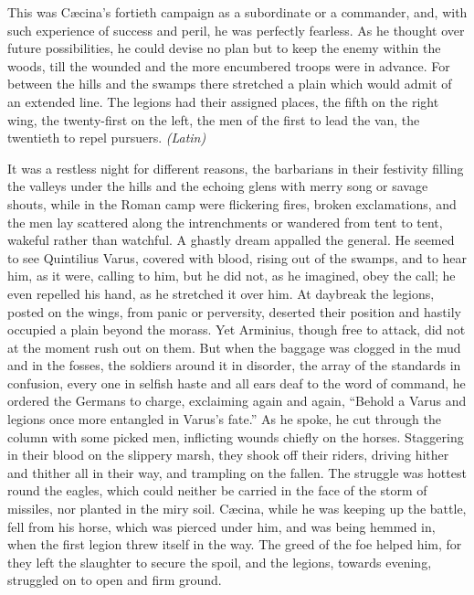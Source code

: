 This was Cæcina's fortieth campaign as a subordinate or a commander, and, with such experience of success and peril, he was perfectly fearless. As he thought over future possibilities, he could devise no plan but to keep the enemy within the woods, till the wounded and the more encumbered troops were in advance. For between the hills and the swamps there stretched a plain which would admit of an extended line. The legions had their assigned places, the fifth on the right wing, the twenty-first on the left, the men of the first to lead the van, the twentieth to repel pursuers. \emph{(Latin)}


It was a restless night for different reasons, the barbarians in their festivity filling the valleys under the hills and the echoing glens with merry song or savage shouts, while in the Roman camp were flickering fires, broken exclamations, and the men lay scattered along the intrenchments or wandered from tent to tent, wakeful rather than watchful. A ghastly dream appalled the general. He seemed to see Quintilius Varus, covered with blood, rising out of the swamps, and to hear him, as it were, calling to him, but he did not, as he imagined, obey the call; he even repelled his hand, as he stretched it over him. At daybreak the legions, posted on the wings, from panic or perversity, deserted their position and hastily occupied a plain beyond the morass. Yet Arminius, though free to attack, did not at the moment rush out on them. But when the baggage was clogged in the mud and in the fosses, the soldiers around it in disorder, the array of the standards in confusion, every one in selfish haste and all ears deaf to the word of command, he ordered the Germans to charge, exclaiming again and again, ``Behold a Varus and legions once more entangled in Varus's fate.'' As he spoke, he cut through the column with some picked men, inflicting wounds chiefly on the horses. Staggering in their blood on the slippery marsh, they shook off their riders, driving hither and thither all in their way, and trampling on the fallen. The struggle was hottest round the eagles, which could neither be carried in the face of the storm of missiles, nor planted in the miry soil. Cæcina, while he was keeping up the battle, fell from his horse, which was pierced under him, and was being hemmed in, when the first legion threw itself in the way. The greed of the foe helped him, for they left the slaughter to secure the spoil, and the legions, towards evening, struggled on to open and firm ground.

